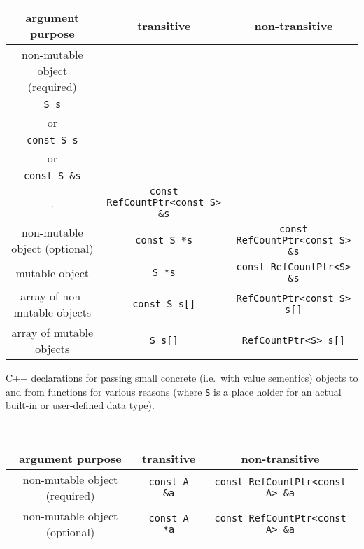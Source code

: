 \begin{table}
%
\begin{minipage}{{}\textwidth}
\begin{tabular}{|c|c|c|}
\hline
argument purpose
& transitive
& non-transitive \\
\hline
non-mutable object (required)
& \begin{minipage}{12ex}
    \begin{center}
    {\tiny .}\\
    {}\texttt{S s} \\
    or \\
    {}\texttt{const S s} \\
    or \\
    {}\texttt{const S \&s} \\
    {\tiny .}
    \end{center}
  \end{minipage}
& {}\texttt{const RefCountPtr<const S> \&s} \\
\hline
non-mutable object (optional)
& {}\texttt{const S *s}
& {}\texttt{const RefCountPtr<const S> \&s} \\
\hline
mutable object
& {}\texttt{S *s}
& {}\texttt{const RefCountPtr<S> \&s} \\
\hline
array of non-mutable objects
& {}\texttt{const S s[]}
& {}\texttt{RefCountPtr<const S> s[]} \\
\hline
array of mutable objects
& {}\texttt{S s[]}
& {}\texttt{RefCountPtr<S> s[]} \\
\hline
\end{tabular}
\begin{center}
C++ declarations for passing small concrete (i.e.~with value
sementics) objects to and from functions for various reasons (where
{}\texttt{S} is a place holder for an actual built-in or user-defined
data type).
\end{center}
\end{minipage}
%
\\[5ex]
%
\begin{minipage}{{}\textwidth}
\begin{tabular}{|c|c|c|}
\hline
argument purpose
& transitive
& non-transitive \\
\hline
non-mutable object (required)
& {}\texttt{const A \&a}
& {}\texttt{const RefCountPtr<const A> \&a} \\
\hline
non-mutable object (optional)
& {}\texttt{const A *a}
& {}\texttt{const RefCountPtr<const A> \&a} \\

\end{tabular}
\end{minipage}
\end{table}
